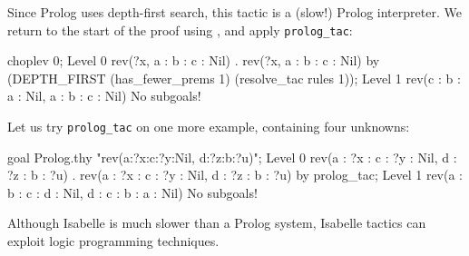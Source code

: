 Since Prolog uses depth-first search, this tactic is a (slow!) 
Prolog interpreter.  We return to the start of the proof using
, and apply {\tt prolog_tac}:
\begin{ttbox}
choplev 0;
{\out Level 0}
{\out rev(?x, a : b : c : Nil)}
{. rev(?x, a : b : c : Nil)}
\ttbreak
by (DEPTH_FIRST (has_fewer_prems 1) (resolve_tac rules 1));
{\out Level 1}
{\out rev(c : b : a : Nil, a : b : c : Nil)}
{\out No subgoals!}
\end{ttbox}
Let us try {\tt prolog_tac} on one more example, containing four unknowns:
\begin{ttbox}
goal Prolog.thy "rev(a:?x:c:?y:Nil, d:?z:b:?u)";
{\out Level 0}
{\out rev(a : ?x : c : ?y : Nil, d : ?z : b : ?u)}
{. rev(a : ?x : c : ?y : Nil, d : ?z : b : ?u)}
\ttbreak
by prolog_tac;
{\out Level 1}
{\out rev(a : b : c : d : Nil, d : c : b : a : Nil)}
{\out No subgoals!}
\end{ttbox}
Although Isabelle is much slower than a Prolog system, Isabelle
tactics can exploit logic programming techniques.  

